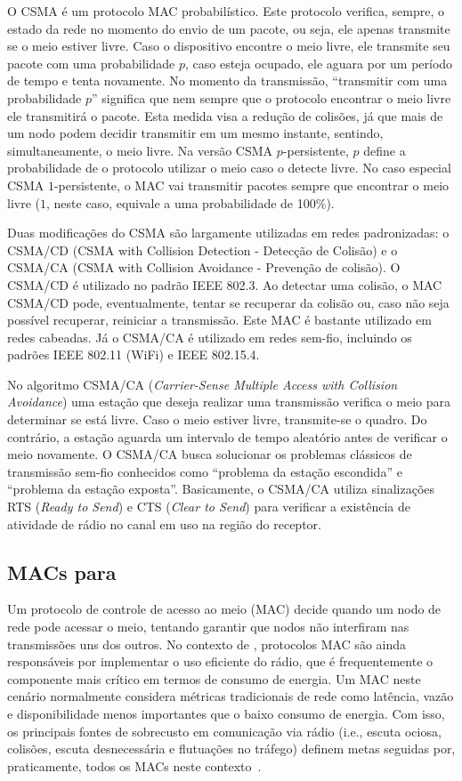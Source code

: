 O CSMA é um protocolo MAC probabilístico. Este protocolo verifica, sempre, o
estado da rede no momento do envio de um pacote, ou seja, ele apenas transmite
se o meio estiver livre. Caso o dispositivo encontre o meio livre, ele transmite
seu pacote com uma probabilidade $p$, caso esteja ocupado, ele aguara por um
período de tempo e tenta novamente. No momento da transmissão, ``transmitir com
uma probabilidade $p$'' significa que nem sempre que o protocolo encontrar o
meio livre ele transmitirá o pacote. Esta medida visa a redução de colisões, já
que mais de um nodo podem decidir transmitir em um mesmo instante, sentindo,
simultaneamente, o meio livre. Na versão CSMA $p$-persistente, $p$ define a
probabilidade de o protocolo utilizar o meio caso o detecte livre. No caso
especial CSMA $1$-persistente, o MAC vai transmitir pacotes sempre que encontrar
o meio livre ($1$, neste caso, equivale a uma probabilidade de 100\%).

Duas modificações do CSMA são largamente utilizadas em redes padronizadas: o
CSMA/CD (CSMA with Collision Detection - Detecção de Colisão) e o CSMA/CA (CSMA
with Collision Avoidance - Prevenção de colisão). O CSMA/CD é utilizado no
padrão IEEE 802.3. Ao detectar uma colisão, o MAC CSMA/CD pode, eventualmente,
tentar se recuperar da colisão ou, caso não seja possível recuperar, reiniciar a
transmissão. Este MAC é bastante utilizado em redes cabeadas. Já o CSMA/CA é
utilizado em redes sem-fio, incluindo os padrões IEEE 802.11 (WiFi) e IEEE
802.15.4.

No algoritmo CSMA/CA (\textit{Carrier-Sense Multiple Access with Collision
Avoidance}) uma estação que deseja realizar uma transmissão verifica o meio para
determinar se está livre. Caso o meio estiver livre, transmite-se o quadro. Do
contrário, a estação aguarda um intervalo de tempo aleatório antes de verificar
o meio novamente. O CSMA/CA busca solucionar os problemas clássicos de
transmissão sem-fio conhecidos como ``problema da estação escondida'' e
``problema da estação exposta''. Basicamente, o CSMA/CA utiliza sinalizações RTS
(\textit{Ready to Send}) e CTS (\textit{Clear to Send}) para verificar a
existência de atividade de rádio no canal em uso na região do receptor.

\subsection{MACs para \rssf}

Um protocolo de controle de acesso ao meio (MAC) decide quando um nodo de rede
pode acessar o meio, tentando garantir que nodos não interfiram nas transmissões
uns dos outros. No contexto de \rssf, protocolos MAC são ainda responsáveis por
implementar o uso eficiente do rádio, que é frequentemente o componente mais
crítico em termos de consumo de energia. Um MAC neste cenário normalmente
considera métricas tradicionais de rede como latência, vazão e disponibilidade
menos importantes que o baixo consumo de energia. Com isso, os principais fontes
de sobrecusto em comunicação via rádio (i.e., escuta ociosa, colisões, escuta
desnecessária e flutuações no tráfego) definem metas seguidas por, praticamente,
todos os MACs neste contexto~\cite{Langendoen:2005}.


